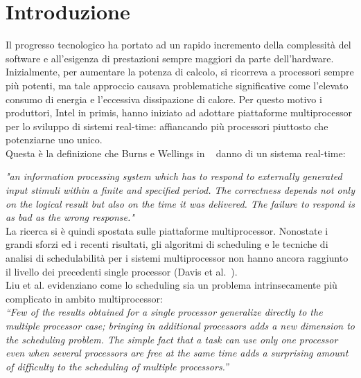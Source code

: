 

\section{Introduzione}
\label{sec:introduzione}

Il progresso tecnologico ha portato ad un rapido incremento della complessità del software e all'esigenza di prestazioni sempre maggiori da parte dell'hardware. Inizialmente, per aumentare la potenza di calcolo, si ricorreva a processori sempre più potenti, ma tale approccio causava problematiche significative come l'elevato consumo di energia e l'eccessiva dissipazione di calore. Per questo motivo i produttori, Intel in primis, hanno iniziato ad adottare piattaforme multiprocessor per lo sviluppo di sistemi real-time: affiancando più processori piuttosto che potenziarne uno unico.\\

Questa è la definizione che Burns e Wellings in ~\cite{Burns:2009:RSP:1643588} danno di un sistema real-time:

\textit{"an information processing system which has to respond to externally generated input stimuli within a finite and specified period. The correctness depends not only on the logical result but also on the time it was delivered. The failure to respond is as bad as the wrong response."}\\

La ricerca si è quindi spostata sulle piattaforme multiprocessor. Nonostate i grandi sforzi ed i recenti risultati, gli algoritmi di scheduling e le tecniche di analisi di schedulabilità per i sistemi multiprocessor non hanno ancora raggiunto il livello dei precedenti single processor (Davis et al.~\cite{Davis:2011:SHR:1978802.1978814}).\\

Liu et al.\cite{Liu:1973:SAM:321738.321743} evidenziano come lo scheduling sia un problema intrinsecamente più complicato in ambito multiprocessor:\\

\textit{“Few of the results obtained for a single processor generalize directly to the multiple processor case; bringing in additional processors adds a new dimension to the scheduling problem. The simple fact that a task can use only one processor even when several processors are free at the same time adds a surprising amount of difficulty to the scheduling of multiple processors.”}\\

